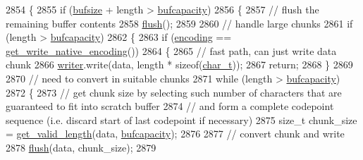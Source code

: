 \begin{DoxyCode}
2854         \{
2855             \textcolor{keywordflow}{if} (\hyperlink{classxml__buffered__writer_a6bad6a93035d796939d84bee30e74ce7}{bufsize} + length > \hyperlink{classxml__buffered__writer_a684aec07739ea6e60d47440eee97b4f6ab8b49b73105796783607f1f1ddd382cd}{bufcapacity})
2856             \{
2857                 \textcolor{comment}{// flush the remaining buffer contents}
2858                 \hyperlink{classxml__buffered__writer_a74192d6bbee5ea387377537ede483b4f}{flush}();
2859 
2860                 \textcolor{comment}{// handle large chunks}
2861                 \textcolor{keywordflow}{if} (length > \hyperlink{classxml__buffered__writer_a684aec07739ea6e60d47440eee97b4f6ab8b49b73105796783607f1f1ddd382cd}{bufcapacity})
2862                 \{
2863                     \textcolor{keywordflow}{if} (\hyperlink{classxml__buffered__writer_ab810a7286598172e1549561b285f08fb}{encoding} == \hyperlink{pugixml_8cpp_a12b9d6cff4d37c68755263d0687c62b1}{get\_write\_native\_encoding}())
2864                     \{
2865                         \textcolor{comment}{// fast path, can just write data chunk}
2866                         \hyperlink{classxml__buffered__writer_a37cdd45f867937e1978565f5a0fa318b}{writer}.write(data, length * \textcolor{keyword}{sizeof}(\hyperlink{namespacepugi_aef5a7a62cba0507542220ea15afe39df}{char\_t}));
2867                         \textcolor{keywordflow}{return};
2868                     \}
2869 
2870                     \textcolor{comment}{// need to convert in suitable chunks}
2871                     \textcolor{keywordflow}{while} (length > \hyperlink{classxml__buffered__writer_a684aec07739ea6e60d47440eee97b4f6ab8b49b73105796783607f1f1ddd382cd}{bufcapacity})
2872                     \{
2873                         \textcolor{comment}{// get chunk size by selecting such number of characters that are guaranteed to fit
       into scratch buffer}
2874                         \textcolor{comment}{// and form a complete codepoint sequence (i.e. discard start of last codepoint if
       necessary)}
2875                         \textcolor{keywordtype}{size\_t} chunk\_size = \hyperlink{pugixml_8cpp_a5dfd2dce8fc6dd9268a19ed553884234}{get\_valid\_length}(data, 
      \hyperlink{classxml__buffered__writer_a684aec07739ea6e60d47440eee97b4f6ab8b49b73105796783607f1f1ddd382cd}{bufcapacity});
2876 
2877                         \textcolor{comment}{// convert chunk and write}
2878                         \hyperlink{classxml__buffered__writer_a74192d6bbee5ea387377537ede483b4f}{flush}(data, chunk\_size);
2879 

\end{DoxyCode}
